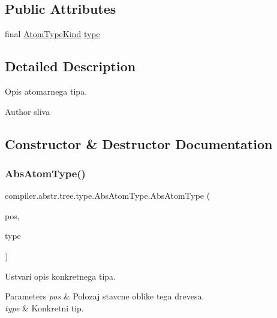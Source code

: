 \subsection*{Public Attributes}
\begin{DoxyCompactItemize}
\item 
final \hyperlink{enumcompiler_1_1abstr_1_1tree_1_1_atom_type_kind}{Atom\+Type\+Kind} \hyperlink{classcompiler_1_1abstr_1_1tree_1_1type_1_1_abs_atom_type_a6a57eb49ff68a7e6be5d3a9ce10480c0}{type}
\end{DoxyCompactItemize}


\subsection{Detailed Description}
Opis atomarnega tipa.

\begin{DoxyAuthor}{Author}
sliva 
\end{DoxyAuthor}


\subsection{Constructor \& Destructor Documentation}
\mbox{\label{classcompiler_1_1abstr_1_1tree_1_1type_1_1_abs_atom_type_a0021c1f666fa5972379a77c8a5379722}} 
\subsubsection{\texorpdfstring{Abs\+Atom\+Type()}{AbsAtomType()}}
{\footnotesize\ttfamily compiler.\+abstr.\+tree.\+type.\+Abs\+Atom\+Type.\+Abs\+Atom\+Type (\begin{DoxyParamCaption}\item[{\hyperlink{classcompiler_1_1_position}{Position}}]{pos,  }\item[{\hyperlink{enumcompiler_1_1abstr_1_1tree_1_1_atom_type_kind}{Atom\+Type\+Kind}}]{type }\end{DoxyParamCaption})}

Ustvari opis konkretnega tipa.


\begin{DoxyParams}{Parameters}
{\em pos} & Polozaj stavcne oblike tega drevesa. \\
\hline
{\em type} & Konkretni tip. \\
\hline
\end{DoxyParams}


